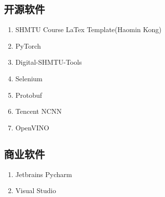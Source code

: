 \subsection{开源软件}

\begin{enumerate}
	\item SHMTU Course LaTex Template(Haomin Kong)\cite{shmtu_course_latex_template}
	\item PyTorch\cite{pytorch}
	\item Digital-SHMTU-Tools\cite{digit_shmtu}
	\item Selenium
	\item Protobuf
	\item Tencent NCNN
	\item OpenVINO
\end{enumerate}

\subsection{商业软件}

\begin{enumerate}
	\item Jetbrains Pycharm
	\item Visual Studio
\end{enumerate}
